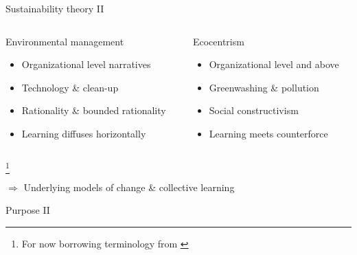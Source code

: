 \begin{frame}{Sustainability theory II}
	\begin{columns}[t]
		\begin{column}{0.48\textwidth}
			\begin{block}{Environmental management}
				\begin{itemize}
					\item Organizational level narratives
					\item Technology \& clean-up
					\item Rationality \& bounded rationality
					\item Learning diffuses horizontally
				\end{itemize}
			\end{block}
		\end{column}
		\begin{column}{0.48\textwidth}
			\begin{block}{Ecocentrism}
				\begin{itemize}
					\item Organizational level and above
					\item Greenwashing \& pollution
					\item Social constructivism
					\emptyline
					\item Learning meets counterforce
				\end{itemize}
			\end{block}
		\end{column}
	\end{columns}
	{\tiny\footnote{\tiny For now borrowing terminology from \citet{Purser1995}}}

	\hrulefill

	\emptyline

	$\Rightarrow$ Underlying models of change \& collective learning
\end{frame}

\blackgroup
\begin{frame}
	Purpose II
\end{frame}
\egroup